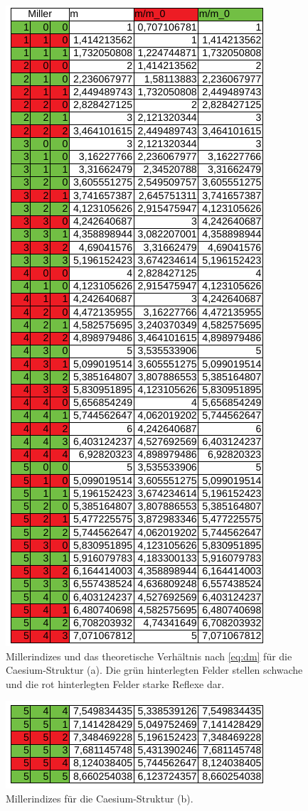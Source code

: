\begin{figure}
  \centering
  \includegraphics{ressources/Caesium.png}
  \caption{Millerindizes und das theoretische Verhältnis nach \ref{eq:dm} für die Caesium-Struktur (a). Die grün hinterlegten Felder stellen schwache und die rot hinterlegten Felder starke Reflexe dar.}
  \label{fig:Anhang3}
\end{figure}

\begin{figure}
  \centering
  \includegraphics{ressources/Caesium2.png}
  \caption{Millerindizes für die Caesium-Struktur (b).}
  \label{fig:Anhang4}
\end{figure}

